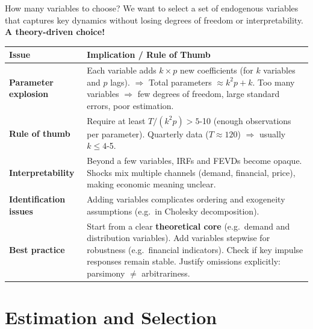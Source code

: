 \documentclass{beamer}
\begin{document}
\begin{frame}{How many variables to choose? }
\scriptsize
We want to select a set of endogenous variables that captures key dynamics
without losing degrees of freedom or interpretability. \textbf{A theory-driven choice!}

\begin{tabular}{p{3.3cm}p{7.8cm}}
\scriptsize
\toprule
\textbf{Issue} & \textbf{Implication / Rule of Thumb} \\
\midrule
\textbf{Parameter explosion} &
Each variable adds $k \times p$ new coefficients (for $k$ variables and $p$ lags). \newline
$\Rightarrow$ Total parameters $\approx k^2 p + k$. \newline
Too many variables $\Rightarrow$ few degrees of freedom, large standard errors, poor estimation. \\[0.2cm]

\textbf{Rule of thumb} &
Require at least $T / (k^2 p) > 5$-10 (enough observations per parameter). \newline
Quarterly data ($T\!\approx\!120$) $\Rightarrow$ usually $k \le 4$-5. \\[0.2cm]

\textbf{Interpretability} &
Beyond a few variables, IRFs and FEVDs become opaque. \newline
Shocks mix multiple channels (demand, financial, price), making economic meaning unclear. \\[0.2cm]

\textbf{Identification issues} &
Adding variables complicates ordering and exogeneity assumptions (e.g.\ in Cholesky decomposition). \\[0.2cm]

\textbf{Best practice} &
Start from a clear \textbf{theoretical core} (e.g.\ demand and distribution variables).
Add variables stepwise for robustness (e.g.\ financial indicators).
Check if key impulse responses remain stable.
 Justify omissions explicitly: parsimony $\neq$ arbitrariness.
\\[0.1cm]
\bottomrule
\end{tabular}

\end{frame}


\section{Estimation and Selection}
\end{document}
